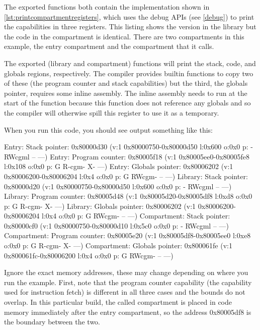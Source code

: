\codelisting[filename=examples/library_or_compartment/interface.h,marker=exports,label=lst:exportcompartmentandlib,caption="A header defining library and compartment exports."]{}

The exported functions both contain the implementation shown in \ref{lst:printcompartmentregisters}, which uses the debug APIs (see \ref{debug}) to print the capabilities in three registers.
This listing shows the version in the library but the code in the compartment is identical.
There are two compartments in this example, the entry compartment and the compartment that it calls.

The exported (library and compartment) functions will print the stack, code, and globals regions, respectively.
The compiler provides builtin functions to copy two of these (the program counter and stack capabilities) but the third, the globals pointer, requires some inline assembly.
The inline assembly needs to run at the start of the function because this function does not reference any globals and so the compiler will otherwise spill this register to use it as a temporary.

\codelisting[filename=examples/library_or_compartment/library.cc,marker=library_implementation,label=lst:printcompartmentregisters,caption="A simple print function to introspect compartment state."]{}

When you run this code, you should see output something like this:

\begin{console}
Entry: Stack pointer: 0x80000d30 (v:1 0x80000750-0x80000d50 l:0x600 o:0x0 p: - RWcgml -- ---)
Entry: Program counter: 0x80005f18 (v:1 0x80005ee0-0x80005fe8 l:0x108 o:0x0 p: G R-cgm- X- ---)
Entry: Globals pointer: 0x80006202 (v:1 0x80006200-0x80006204 l:0x4 o:0x0 p: G RWcgm- -- ---)
Library: Stack pointer: 0x80000d20 (v:1 0x80000750-0x80000d50 l:0x600 o:0x0 p: - RWcgml -- ---)
Library: Program counter: 0x80005d48 (v:1 0x80005d20-0x80005df8 l:0xd8 o:0x0 p: G R-cgm- X- ---)
Library: Globals pointer: 0x80006202 (v:1 0x80006200-0x80006204 l:0x4 o:0x0 p: G RWcgm- -- ---)
Compartment: Stack pointer: 0x80000cf0 (v:1 0x80000750-0x80000d10 l:0x5c0 o:0x0 p: - RWcgml -- ---)
Compartment: Program counter: 0x80005e20 (v:1 0x80005df8-0x80005ee0 l:0xe8 o:0x0 p: G R-cgm- X- ---)
Compartment: Globals pointer: 0x800061fe (v:1 0x800061fc-0x80006200 l:0x4 o:0x0 p: G RWcgm- -- ---)
\end{console}

Ignore the exact memory addresses, these may change depending on where you run the example.
First, note that the program counter capability (the capability used for instruction fetch) is different in all three cases and the bounds do not overlap.
In this particular build, the called compartment is placed in code memory immediately after the entry compartment, so the address 0x80005df8 is the boundary between the two.

